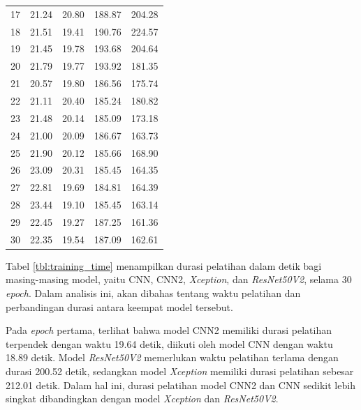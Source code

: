 \begin{table}[!hbt]
\begin{tabular}{|c|c|c|c|c|}
	17             & 21.24        & 20.80         & 188.87            & 204.28              \\
	18             & 21.51        & 19.41         & 190.76            & 224.57              \\
	19             & 21.45        & 19.78         & 193.68            & 204.64              \\
	20             & 21.79        & 19.77         & 193.92            & 181.35              \\
	21             & 20.57        & 19.80         & 186.56            & 175.74              \\
	22             & 21.11        & 20.40         & 185.24            & 180.82              \\
	23             & 21.48        & 20.14         & 185.09            & 173.18              \\
	24             & 21.00        & 20.09         & 186.67            & 163.73              \\
	25             & 21.90        & 20.12         & 185.66            & 168.90              \\
	26             & 23.09        & 20.31         & 185.45            & 164.35              \\
	27             & 22.81        & 19.69         & 184.81            & 164.39              \\
	28             & 23.44        & 19.10         & 185.45            & 163.14              \\
	29             & 22.45        & 19.27         & 187.25            & 161.36              \\
	30             & 22.35        & 19.54         & 187.09            & 162.61              \\ 
	\hline
	\end{tabular}
\end{table}
Tabel \ref{tbl:training_time} menampilkan durasi pelatihan dalam detik bagi masing-masing model, yaitu CNN, CNN2, \textit{Xception}, dan \textit{ResNet50V2}, selama 30 \textit{epoch}. Dalam analisis ini, akan dibahas tentang waktu pelatihan dan perbandingan durasi antara keempat model tersebut.

Pada \textit{epoch} pertama, terlihat bahwa model CNN2 memiliki durasi pelatihan terpendek dengan waktu 19.64 detik, diikuti oleh model CNN dengan waktu 18.89 detik. Model \textit{ResNet50V2} memerlukan waktu pelatihan terlama dengan durasi 200.52 detik, sedangkan model \textit{Xception} memiliki durasi pelatihan sebesar 212.01 detik. Dalam hal ini, durasi pelatihan model CNN2 dan CNN sedikit lebih singkat dibandingkan dengan model \textit{Xception} dan \textit{ResNet50V2}.

